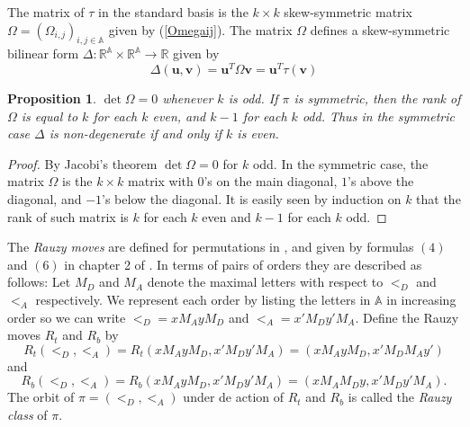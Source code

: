 \documentclass[12pt,a4paper]{amsart}
\newcommand{\reals}{{\mathbb R}}
\newcommand{\A}{{\mathbb A}}
\newtheorem{proposition}{Proposition}
\begin{document}
        
The matrix of $\tau$ in the standard basis is the $k\times k$ skew-symmetric  matrix $\Omega=(\Omega_{i,j})_{i,j\in \A}$  given by (\ref{Omegaij}). 
The matrix $\Omega$ defines a skew-symmetric bilinear form  $\Delta : \reals ^{\A} \times \reals ^{\A} \rightarrow \reals$  given by 
\[\Delta(\mathbf u, \mathbf v)=\mathbf u^T \Omega \mathbf v=\mathbf u ^T\tau(\mathbf v) \]



     
    \begin{proposition}\label{invert}  $\det \Omega =0$  whenever $k$ is odd. If $\pi$ is symmetric, then  the rank of $\Omega$ is equal to $k$ for each $k$ even, and $k-1$ for each $k$ odd. Thus in the symmetric case $\Delta$ is non-degenerate  if and only if  $k$ is even. 
\end{proposition}

\begin{proof} By Jacobi's theorem $\det \Omega= 0$ for $k$ odd. In the symmetric case, the matrix   $\Omega$ is the $k\times k$ matrix with $0$'s on the main diagonal, $1$'s above the diagonal, and $-1$'s below the diagonal. It is easily seen by induction on $k$ that the rank of such matrix is $k$ for each $k$ even and $k-1$ for each $k$ odd.  \end{proof}

The {\it Rauzy moves} are defined  for permutations in \cite{rau}, and given by formulas $(4)$ and $(6)$ in chapter 2 of \cite{via}. In terms of pairs of orders they are described as follows: Let $M_D$ and  $M_A$ denote the maximal letters with respect to $<_D$ and $<_A$ respectively. We represent each order by listing the letters in $\A$ in increasing order so we can write  
$<_D=xM_AyM_D$ and $<_A=x'M_Dy'M_A.$ 
Define the Rauzy moves $R_t$ and $R_b$ by 
 \[R_t(<_D,<_A)=R_t( xM_AyM_D,  x'M_Dy'M_A)=(xM_AyM_D, x'M_DM_Ay')\] and
\[R_b(<_D,<_A)=R_b( xM_AyM_D,  x'M_Dy'M_A)=(xM_AM_Dy, x'M_Dy'M_A).\] 
The orbit of $\pi=(<_D,<_A)$ under de action of $R_t$ and $R_b$ is called the {\it Rauzy class} of $\pi.$ 
\end{document}
